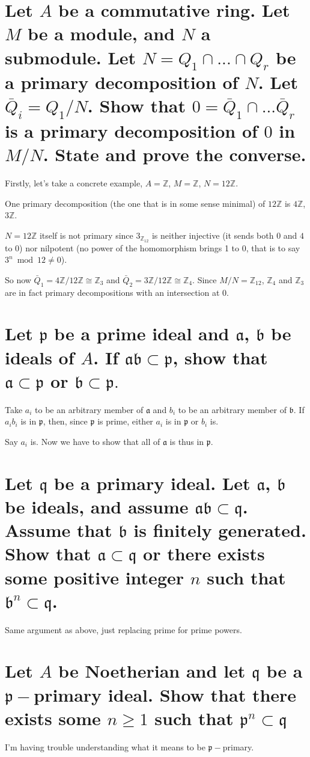 \documentclass{article}
\begin{document}
\section{Let $A$ be a commutative ring. Let $M$ be a module, and $N$ a submodule. Let $N=Q_1 \cap ... \cap Q_r$ be a primary decomposition of $N$. Let $\bar{Q}_i = Q_1/N$. Show that $0 = \bar{Q}_1 \cap ... \bar{Q}_r$ is a primary decomposition of $0$ in $M/N$. State and prove the converse.}

Firstly, let's take a concrete example, $A=\mathbb{Z}$, $M=\mathbb{Z}$, $N=12\mathbb{Z}$.

One primary decomposition (the one that is in some sense minimal) of $12\mathbb{Z}$ is $4\mathbb{Z}$, $3\mathbb{Z}$.

$N=12\mathbb{Z}$ itself is not primary since $3_{\mathbb{Z}_{12}}$ is neither injective (it sends both $0$ and $4$ to 0) nor nilpotent (no power of the homomorphism brings 1 to 0, that is to say $3^n \bmod 12 \ne 0$).

So now $\bar{Q}_1 = 4\mathbb{Z} / 12\mathbb{Z} \cong \mathbb{Z}_3$ and $\bar{Q}_2 = 3\mathbb{Z} / 12\mathbb{Z} \cong \mathbb{Z}_4$. Since $M/N = \mathbb{Z}_12$, $\mathbb{Z}_4$ and $\mathbb{Z}_3$ are in fact primary decompositions with an intersection at $0$. 

\section{Let $\mathfrak{p}$ be a prime ideal and $\mathfrak{a}$, $\mathfrak{b}$ be ideals of $A$. If $\mathfrak{a b} \subset \mathfrak{p}$, show that $\mathfrak{a} \subset \mathfrak{p}$ or $\mathfrak{b} \subset \mathfrak{p}.$}

Take $a_i$ to be an arbitrary member of $\mathfrak{a}$ and $b_i$ to be an arbitrary member of $\mathfrak{b}$. If $a_i b_i$ is in $\mathfrak{p}$, then, since $\mathfrak{p}$ is prime, either $a_i$ is in $\mathfrak{p}$ or $b_i$ is.

Say $a_i$ is. Now we have to show that all of $\mathfrak{a}$ is thus in $\mathfrak{p}$.

\section{Let $\mathfrak{q}$ be a primary ideal. Let $\mathfrak{a}$, $\mathfrak{b}$ be ideals, and assume $\mathfrak{ab} \subset \mathfrak{q}$. Assume that $\mathfrak{b}$ is finitely generated. Show that $\mathfrak{a} \subset  \mathfrak{q}$ or there exists some positive integer $n$ such that $\mathfrak{b}^n \subset \mathfrak{q}$.}

Same argument as above, just replacing prime for prime powers.

\section{Let $A$ be Noetherian and let $\mathfrak{q}$ be a $\mathfrak{p}-$primary ideal. Show that there exists some $n \ge 1$ such that $\mathfrak{p}^n \subset \mathfrak{q}$}

I'm having trouble understanding what it means to be $\mathfrak{p}-$primary.
\end{document}
